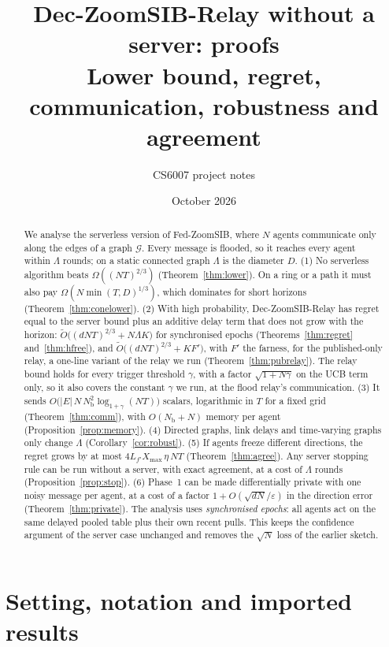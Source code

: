 \documentclass[11pt]{article}
\title{Dec-ZoomSIB-Relay without a server: proofs\\[2pt]
\large Lower bound, regret, communication, robustness and agreement}
\author{CS6007 project notes}
\date{October 2026}
\theoremstyle{definition}
\newcommand{\Nb}{N_{\mathrm b}}
\newcommand{\Xmax}{X_{\max}}
\newcommand{\cG}{\mathcal{G}}
\begin{document}
\maketitle

\begin{abstract}
We analyse the serverless version of Fed-ZoomSIB, where $N$ agents communicate only along the edges of a graph
$\cG$. Every message is flooded, so it reaches every agent within $\Lambda$ rounds; on a static connected graph
$\Lambda$ is the diameter $D$. (1) No serverless algorithm beats $\Omega((NT)^{2/3})$ (Theorem~\ref{thm:lower}).
On a ring or a path it must also pay $\Omega(N\min(T,D)^{1/3})$, which dominates for short horizons
(Theorem~\ref{thm:conelower}). (2) With high probability, Dec-ZoomSIB-Relay has regret equal to the server bound plus an
additive delay term that does not grow with the horizon: $\tilde O\big((d NT)^{2/3}+N\Lambda K\big)$ for synchronised
epochs (Theorems~\ref{thm:regret} and~\ref{thm:hfree}), and $\tilde O\big((d NT)^{2/3}+KF'\big)$, with $F'$ the farness,
for the published-only relay, a one-line variant of the relay we run (Theorem~\ref{thm:pubrelay}). The relay bound
holds for every trigger threshold $\gamma$, with a factor $\sqrt{1+N\gamma}$ on the UCB term only, so it also covers the
constant $\gamma$ we run, at the flood relay's communication. (3) It sends $O\big(|E|\,N\,\Nb^2\log_{1+\gamma}(NT)\big)$ scalars, logarithmic in $T$ for a fixed
grid (Theorem~\ref{thm:comm}), with $O(\Nb+N)$ memory per agent (Proposition~\ref{prop:memory}). (4) Directed graphs,
link delays and time-varying graphs only change $\Lambda$ (Corollary~\ref{cor:robust}). (5) If agents freeze different
directions, the regret grows by at most $4L_{f'}\Xmax\,\eta\, NT$ (Theorem~\ref{thm:agree}). Any server stopping rule
can be run without a server, with exact agreement, at a cost of $\Lambda$ rounds (Proposition~\ref{prop:stop}).
(6) Phase~1 can be made differentially private with one noisy message per agent, at a cost of a factor
$1+O(\sqrt{dN}/\varepsilon)$ in the direction error (Theorem~\ref{thm:private}). The analysis uses \emph{synchronised
epochs}: all agents act on the same delayed pooled table plus their own recent pulls. This keeps the confidence
argument of the server case unchanged and removes the $\sqrt N$ loss of the earlier sketch.
\end{abstract}

\tableofcontents

\section{Setting, notation and imported results}\label{sec:setting}
\end{document}
